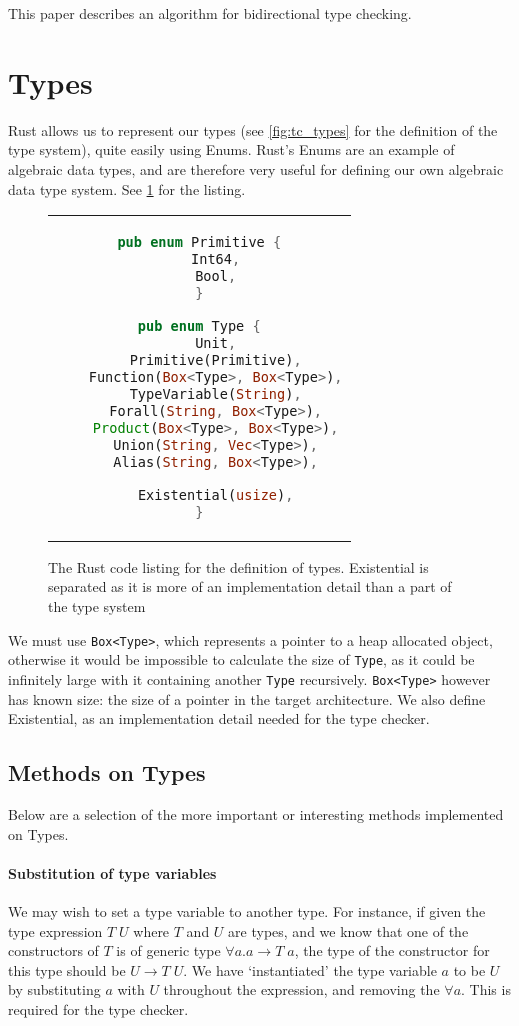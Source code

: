 This paper describes an algorithm for bidirectional type checking.



\section{Types}

Rust allows us to represent our types (see \ref{fig:tc_types} for the definition of the type system), quite easily using Enums. Rust's Enums are an example of algebraic data types, and are therefore very useful for defining our own algebraic data type system. See \ref{fig:type_lst} for the listing. 

\begin{figure}[ht]
    \centering
    \begin{tabular}{c}
    \begin{lstlisting}[language=Rust]
pub enum Primitive {
    Int64,
    Bool,
}

pub enum Type {
    Unit,
    Primitive(Primitive),
    Function(Box<Type>, Box<Type>),
    TypeVariable(String),
    Forall(String, Box<Type>),
    Product(Box<Type>, Box<Type>),
    Union(String, Vec<Type>),
    Alias(String, Box<Type>),

    Existential(usize),
}
    \end{lstlisting}
    \end{tabular}
    \caption{The Rust code listing for the definition of types. Existential is separated as it is more of an implementation detail than a part of the type system}
    \label{fig:type_lst}
\end{figure}

We must use \verb|Box<Type>|, which represents a pointer to a heap allocated object, otherwise it would be impossible to calculate the size of \verb|Type|, as it could be infinitely large with it containing another \verb|Type| recursively. \verb|Box<Type>| however has known size: the size of a pointer in the target architecture. We also define Existential, as an implementation detail needed for the type checker. 

\subsection{Methods on Types}
Below are a selection of the more important or interesting methods implemented on Types.

\paragraph{Substitution of type variables} We may wish to set a type variable to another type. For instance, if given the type expression \(T \; U\) where \(T\) and \(U\) are types, and we know that one of the constructors of \(T\) is of generic type \(\forall a.a \rightarrow T \; a\), the type of the constructor for this type should be \(U \rightarrow T \; U\). We have `instantiated' the type variable \(a\) to be \(U\) by substituting \(a\) with \(U\) throughout the expression, and removing the \(\forall a\). This is required for the type checker. 

